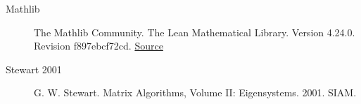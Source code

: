 \begin{description}
\item[Mathlib] The Mathlib Community. The Lean Mathematical Library. Version 4.24.0. Revision f897ebcf72cd. \href{https://github.com/leanprover-community/mathlib4/tree/f897ebcf72cd16f89ab4577d0c826cd14afaafc7}{Source}
\item[Stewart 2001] G. W. Stewart. Matrix Algorithms, Volume II: Eigensystems. 2001. SIAM.
\end{description}
